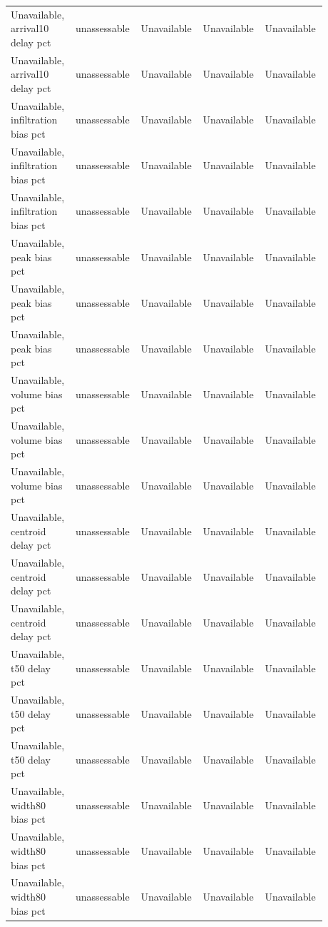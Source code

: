 \begin{longtable}{p{0.1760\linewidth}p{0.1760\linewidth}p{0.1760\linewidth}p{0.1760\linewidth}p{0.1760\linewidth}}
Unavailable, arrival10 delay pct & unassessable & Unavailable & Unavailable & Unavailable \\
Unavailable, arrival10 delay pct & unassessable & Unavailable & Unavailable & Unavailable \\
Unavailable, infiltration bias pct & unassessable & Unavailable & Unavailable & Unavailable \\
Unavailable, infiltration bias pct & unassessable & Unavailable & Unavailable & Unavailable \\
Unavailable, infiltration bias pct & unassessable & Unavailable & Unavailable & Unavailable \\
Unavailable, peak bias pct & unassessable & Unavailable & Unavailable & Unavailable \\
Unavailable, peak bias pct & unassessable & Unavailable & Unavailable & Unavailable \\
Unavailable, peak bias pct & unassessable & Unavailable & Unavailable & Unavailable \\
Unavailable, volume bias pct & unassessable & Unavailable & Unavailable & Unavailable \\
Unavailable, volume bias pct & unassessable & Unavailable & Unavailable & Unavailable \\
Unavailable, volume bias pct & unassessable & Unavailable & Unavailable & Unavailable \\
Unavailable, centroid delay pct & unassessable & Unavailable & Unavailable & Unavailable \\
Unavailable, centroid delay pct & unassessable & Unavailable & Unavailable & Unavailable \\
Unavailable, centroid delay pct & unassessable & Unavailable & Unavailable & Unavailable \\
Unavailable, t50 delay pct & unassessable & Unavailable & Unavailable & Unavailable \\
Unavailable, t50 delay pct & unassessable & Unavailable & Unavailable & Unavailable \\
Unavailable, t50 delay pct & unassessable & Unavailable & Unavailable & Unavailable \\
Unavailable, width80 bias pct & unassessable & Unavailable & Unavailable & Unavailable \\
Unavailable, width80 bias pct & unassessable & Unavailable & Unavailable & Unavailable \\
Unavailable, width80 bias pct & unassessable & Unavailable & Unavailable & Unavailable \\

\end{longtable}
